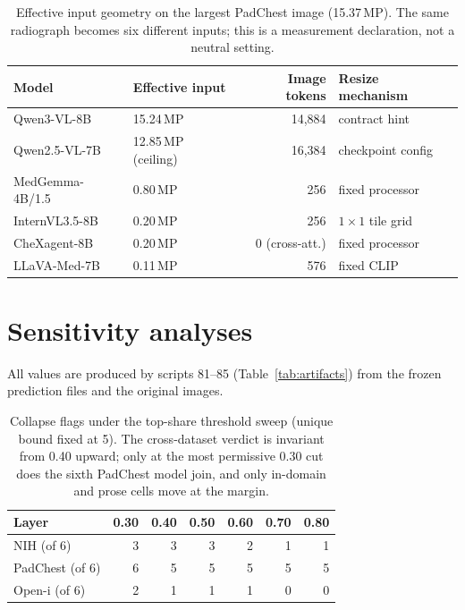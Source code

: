 \begin{table}[H]
\centering
\small
\caption{Effective input geometry on the largest PadChest image (15.37\,MP). The same radiograph becomes six different inputs; this is a measurement declaration, not a neutral setting.}
\label{tab:geometry}
\begin{tabular}{llrl}
\toprule
Model & Effective input & Image tokens & Resize mechanism \\
\midrule
Qwen3-VL-8B & 15.24\,MP & 14,884 & contract hint \\
Qwen2.5-VL-7B & 12.85\,MP (ceiling) & 16,384 & checkpoint config \\
MedGemma-4B/1.5 & 0.80\,MP & 256 & fixed processor \\
InternVL3.5-8B & 0.20\,MP & 256 & $1\times1$ tile grid \\
CheXagent-8B & 0.20\,MP & 0 (cross-att.) & fixed processor \\
LLaVA-Med-7B & 0.11\,MP & 576 & fixed CLIP \\
\bottomrule
\end{tabular}
\end{table}

\section{Sensitivity analyses}
\label{app:risk}

All values are produced by scripts 81--85 (Table~\ref{tab:artifacts}) from the frozen prediction files and the original images.

\begin{table}[H]
\centering
\small
\caption{Collapse flags under the top-share threshold sweep (unique bound fixed at 5). The cross-dataset verdict is invariant from 0.40 upward; only at the most permissive 0.30 cut does the sixth PadChest model join, and only in-domain and prose cells move at the margin.}
\label{tab:sweep}
\begin{tabular}{lrrrrrr}
\toprule
Layer & 0.30 & 0.40 & 0.50 & 0.60 & 0.70 & 0.80 \\
\midrule
NIH (of 6) & 3 & 3 & 3 & 2 & 1 & 1 \\
PadChest (of 6) & 6 & 5 & 5 & 5 & 5 & 5 \\
Open-i (of 6) & 2 & 1 & 1 & 1 & 0 & 0 \\
\bottomrule
\end{tabular}
\end{table}

